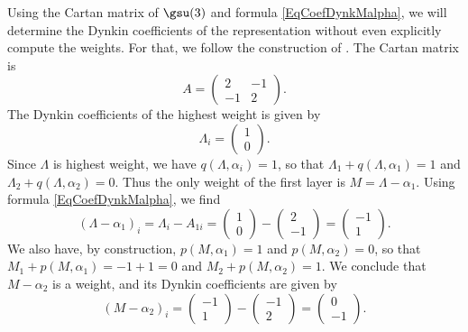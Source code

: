 Using the Cartan matrix of $\gsu(3)$ and formula \eqref{EqCoefDynkMalpha}, we will determine the Dynkin coefficients of the representation
%
 without even explicitly compute the weights. For that, we follow the construction of \cite{rncahn}. The Cartan matrix is
\begin{equation}
	A=
	\begin{pmatrix}
		2	&	-1	\\
		-1	&	2
	\end{pmatrix}.
\end{equation}
The Dynkin coefficients of the highest weight is given by
\begin{equation}
	\Lambda_i=
	\begin{pmatrix}
		1	\\
		0
	\end{pmatrix}.
\end{equation}
Since $\Lambda$ is highest weight, we have $q(\Lambda,\alpha_i)=1$, so that $\Lambda_1+q(\Lambda,\alpha_1)=1$ and $\Lambda_2+q(\Lambda,\alpha_2)=0$. Thus the only weight of the first layer is $M=\Lambda-\alpha_1$.
Using formula \eqref{EqCoefDynkMalpha}, we find
\begin{equation}
	(\Lambda-\alpha_1)_i=\Lambda_i-A_{1i}=
	\begin{pmatrix}
		1	\\
		0
	\end{pmatrix}-
	\begin{pmatrix}
		2	\\
		-1
	\end{pmatrix}=
	\begin{pmatrix}
		-1	\\
		1
	\end{pmatrix}.
\end{equation}
We also have, by construction, $p(M,\alpha_1)=1$ and $p(M,\alpha_2)=0$, so that $M_1+p(M,\alpha_1)=-1+1=0$ and $M_2+p(M,\alpha_2)=1$. We conclude that $M-\alpha_2$ is a weight, and its Dynkin coefficients are given by
\begin{equation}
	(M-\alpha_2)_i=
	\begin{pmatrix}
		-1	\\
		1
	\end{pmatrix}-
	\begin{pmatrix}
		-1	\\
		2
	\end{pmatrix}=
	\begin{pmatrix}
		0	\\
		-1
	\end{pmatrix}.
\end{equation}

